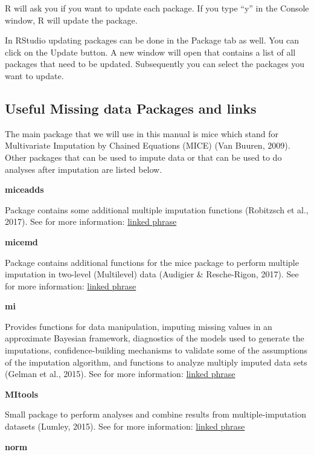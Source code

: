 \documentclass[]{book}
\begin{document}
R will ask you if you want to update each package. If you type ``y'' in
the Console window, R will update the package.

In RStudio updating packages can be done in the Package tab as well. You
can click on the Update button. A new window will open that contains a
list of all packages that need to be updated. Subsequently you can
select the packages you want to update.

\subsection{Useful Missing data Packages and
links}\label{useful-missing-data-packages-and-links}

The main package that we will use in this manual is mice which stand for
Multivariate Imputation by Chained Equations (MICE) (Van Buuren, 2009).
Other packages that can be used to impute data or that can be used to do
analyses after imputation are listed below.

\textbf{miceadds}

Package contains some additional multiple imputation functions
(Robitzsch et al., 2017). See for more information:
\href{https://cran.r-project.org/web/packages/miceadds/index.html}{linked
phrase}

\textbf{micemd}

Package contains additional functions for the mice package to perform
multiple imputation in two-level (Multilevel) data (Audigier \&
Resche-Rigon, 2017). See for more information:
\href{https://cran.r-project.org/web/packages/micemd/index.html}{linked
phrase}

\textbf{mi}

Provides functions for data manipulation, imputing missing values in an
approximate Bayesian framework, diagnostics of the models used to
generate the imputations, confidence-building mechanisms to validate
some of the assumptions of the imputation algorithm, and functions to
analyze multiply imputed data sets (Gelman et al., 2015). See for more
information:
\href{https://cran.r-project.org/web/packages/mi/index.html}{linked
phrase}

\textbf{MItools}

Small package to perform analyses and combine results from
multiple-imputation datasets (Lumley, 2015). See for more information:
\href{https://cran.r-project.org/web/packages/mitools/index.html}{linked
phrase}

\textbf{norm}
\end{document}
